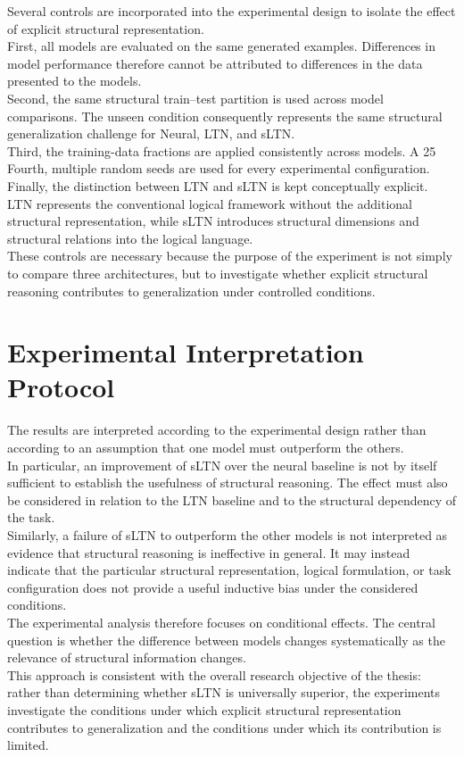 \noindent
Several controls are incorporated into the experimental design to isolate the effect of explicit structural representation.
\\
First, all models are evaluated on the same generated examples. Differences in model performance therefore cannot be attributed to differences in the data presented to the models.
\\
Second, the same structural train--test partition is used across model comparisons. The unseen condition consequently represents the same structural generalization challenge for Neural, LTN, and sLTN.
\\
Third, the training-data fractions are applied consistently across models. A 25%
\\
Fourth, multiple random seeds are used for every experimental configuration.
\\
Finally, the distinction between LTN and sLTN is kept conceptually explicit. LTN represents the conventional logical framework without the additional structural representation, while sLTN introduces structural dimensions and structural relations into the logical language.
\\
These controls are necessary because the purpose of the experiment is not simply to compare three architectures, but to investigate whether explicit structural reasoning contributes to generalization under controlled conditions.

\section{Experimental Interpretation Protocol}

\noindent
The results are interpreted according to the experimental design rather than according to an assumption that one model must outperform the others.
\\
In particular, an improvement of sLTN over the neural baseline is not by itself sufficient to establish the usefulness of structural reasoning. The effect must also be considered in relation to the LTN baseline and to the structural dependency of the task.
\\
Similarly, a failure of sLTN to outperform the other models is not interpreted as evidence that structural reasoning is ineffective in general. It may instead indicate that the particular structural representation, logical formulation, or task configuration does not provide a useful inductive bias under the considered conditions.
\\
The experimental analysis therefore focuses on conditional effects. The central question is whether the difference between models changes systematically as the relevance of structural information changes.
\\
This approach is consistent with the overall research objective of the thesis: rather than determining whether sLTN is universally superior, the experiments investigate the conditions under which explicit structural representation contributes to generalization and the conditions under which its contribution is limited.
